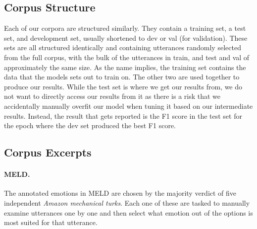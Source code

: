 \documentclass[nofilelist]{cslthse-msc}
\begin{document}
\subsection{Corpus Structure}
Each of our corpora are structured similarly. They contain a training set, a test set, and development set, usually shortened to dev or val (for validation). These sets are all structured identically and containing utterances randomly selected from the full corpus, with the bulk of the utterances in train, and test and val of approximately the same size. As the name implies, the training set contains the data that the models sets out to train on. The other two are used together to produce our results. While the test set is where we get our results from, we do not want to directly access our results from it as there is a risk that we accidentally manually overfit our model when tuning it based on our intermediate results. Instead, the result that gets reported is the F1 score in the test set for the epoch where the dev set produced the best F1 score. 


\subsection{Corpus Excerpts}
\label{corpus_excerpts}
\paragraph{MELD.} The annotated emotions in MELD are chosen by the majority verdict of five independent \textit{Amazon mechanical turks}. Each one of these are tasked to manually examine utterances one by one and then select what emotion out of the options is most suited for that utterance.
\newenvironment{pag}{\fontfamily{pag}\selectfont}{\par}
\end{document}
